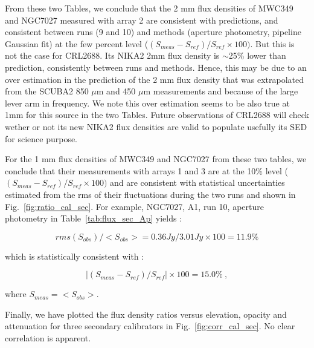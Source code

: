 From these two Tables, we conclude that  the 2 mm flux densities of MWC349 and NGC7027 measured with array 2 are consistent with predictions,
and consistent between runs (9 and 10) and methods (aperture photometry, pipeline Gaussian fit) at the few percent level
($(S_{meas}-S_{ref})/S_{ref} \times 100)$. But this is not the case for CRL2688.  Its NIKA2 2mm
flux density is $\sim$25\% lower than prediction, consistently between runs and methods. Hence, this may be due to an over estimation
in the prediction of the 2 mm flux density that was extrapolated from the SCUBA2 850 $\mu$m and 450 $\mu$m measurements
and because of the large lever arm in frequency. We note this
over estimation seems to be also true at 1mm for this source in the two Tables.
Future observations of CRL2688 will check wether or not its new NIKA2 flux densities are valid to populate usefully its SED
for science purpose. 

For the 1 mm flux densities of MWC349 and NGC7027 from these two tables, we conclude that their  measurements with arrays 1 and 3 are
at the 10\% level   ($(S_{meas}-S_{ref})/S_{ref} \times 100)$  and are consistent with statistical uncertainties estimated from
the rms of their fluctuations
during the two runs and shown in Fig.~\ref{fig:ratio_cal_sec}. For example, NGC7027, A1, run 10, aperture photometry in Table~\ref{tab:flux_sec_Ap}
yields  :

$$rms(S_{obs})/<S_{obs}>=0.36Jy/3.01Jy \times 100=11.9\%$$

\noindent which is statistically consistent with :

$$|(S_{meas}-S_{ref})/S_{ref}| \times 100=15.0\%~,$$

\noindent where $S_{meas} = <S_{obs}>$.

Finally, we have plotted the flux density ratios versus elevation, opacity and attenuation  for three
secondary calibrators in  Fig.~\ref{fig:corr_cal_sec}. No clear correlation is apparent.

